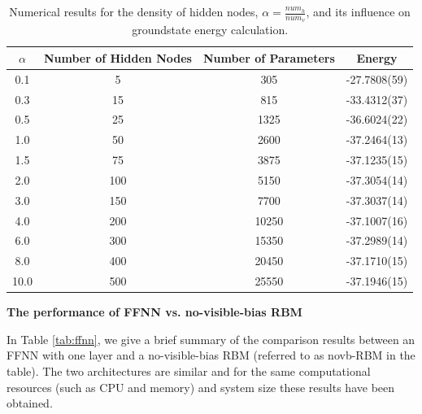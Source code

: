 \documentclass{article}
\begin{document}
\begin{table}[!htb]
	\centering
	{
    \begin{tabular}{|c|c|c|c|}
    \hline
    $\alpha$&Number of Hidden Nodes&Number of Parameters&Energy\\
    \hline \hline
    0.1&  5& 305&-27.7808(59)\\
    \hline
    0.3& 15& 815&-33.4312(37)\\
    \hline
    0.5& 25&1325&-36.6024(22)\\
    \hline
    1.0& 50&2600&-37.2464(13)\\
    \hline
    1.5& 75&3875&-37.1235(15)\\
    \hline
    2.0&100&5150&-37.3054(14)\\
    \hline
    3.0&150&7700&-37.3037(14)\\
    \hline
    4.0&200&10250&-37.1007(16)\\
    \hline
    6.0&300&15350&-37.2989(14)\\
    \hline
    8.0&400&20450&-37.1710(15)\\
    \hline
    10.0&500&25550&-37.1946(15)\\
    \hline
    \end{tabular}}
    \vspace{2mm}
	\caption{\label{tab:alpha} Numerical results for the density of hidden nodes, $\alpha = \frac{num_{h}}{num_{v}}$, and its influence on groundstate energy calculation.} 
\end{table}



\textbf{The performance of FFNN vs. no-visible-bias RBM}

In Table \hspace{0.2mm}\ref{tab:ffnn}, we give a brief summary of the comparison results between an FFNN with one layer and a no-visible-bias RBM (referred to as novb-RBM in the table). The two architectures are similar and for the same computational resources (such as CPU and memory) and system size these results have been obtained.
\end{document}
